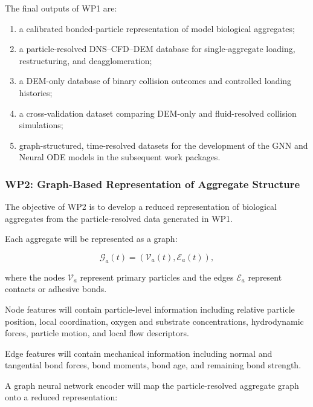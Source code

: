 \documentclass[11pt,a4paper,twoside]{scrartcl}
\begin{document}
The final outputs of WP1 are:

\begin{enumerate}
	\item a calibrated bonded-particle representation of model biological aggregates;
	
	\item a particle-resolved DNS--CFD--DEM database for single-aggregate loading, restructuring, and deagglomeration;
	
	\item a DEM-only database of binary collision outcomes and controlled loading histories;
	
	\item a cross-validation dataset comparing DEM-only and fluid-resolved collision simulations;
	
	\item graph-structured, time-resolved datasets for the development of the GNN and Neural ODE models in the subsequent work packages.
\end{enumerate}


\subsubsection{WP2: Graph-Based Representation of Aggregate Structure}

The objective of WP2 is to develop a reduced representation of biological aggregates from the particle-resolved data generated in WP1.

Each aggregate will be represented as a graph:

\begin{equation}
	\mathcal{G}_a(t)
	=
	\left(
	\mathcal{V}_a(t),
	\mathcal{E}_a(t)
	\right),
\end{equation}

where the nodes $\mathcal{V}_a$ represent primary particles and the edges $\mathcal{E}_a$ represent contacts or adhesive bonds.

Node features will contain particle-level information including relative particle position, local coordination, oxygen and substrate concentrations, hydrodynamic forces, particle motion, and local flow descriptors.

Edge features will contain mechanical information including normal and tangential bond forces, bond moments, bond age, and remaining bond strength.

A graph neural network encoder will map the particle-resolved aggregate graph onto a reduced representation:
\end{document}
